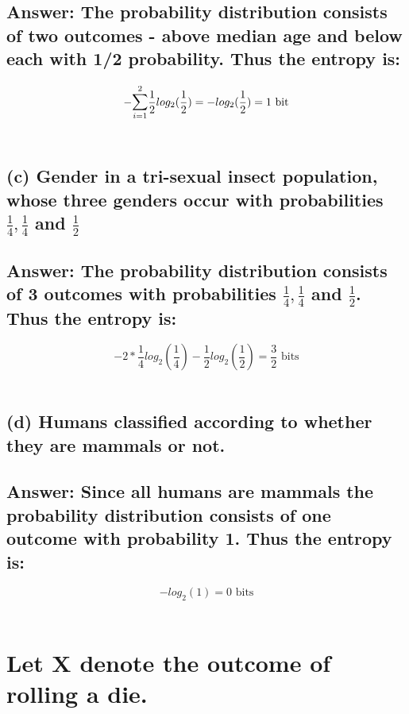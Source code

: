 \documentclass[15px]{article}
\begin{document}
\subsection*{Answer: The probability distribution consists of two outcomes  - above median age and below each with 1/2 probability. Thus the entropy is:}
\begin{equation}
-\mathlarger{\sum}_{i=1}^{2} \frac{1}{2}log_2(\frac{1}{2}) = -log_2(\frac{1}{2}) = 1 \text{ bit}
\end{equation} \\

\subsection*{\normalfont (c) Gender in a tri-sexual insect population, whose three genders occur with probabilities \(\frac{1}{4}, \frac{1}{4}\) and \(\frac{1}{2}\)}

\subsection*{ Answer: The probability distribution consists of 3 outcomes with probabilities \(\frac{1}{4}, \frac{1}{4}\) and \(\frac{1}{2}\). Thus the entropy is:}
\begin{equation}
- 2*\frac{1}{4}log_2(\frac{1}{4}) - \frac{1}{2}log_2(\frac{1}{2}) = \frac{3}{2} \text{ bits}
\end{equation} \\

\subsection*{\normalfont(d) Humans classified according to whether they are mammals or not.} 

\subsection*{ Answer: Since all humans are mammals the probability distribution consists of one outcome with probability 1. Thus the entropy is:}
\begin{equation}
- log_2(1) = 0 \text{ bits}
\end{equation} \\

\section{\normalfont Let X denote the outcome of rolling a die.}
\end{document}
